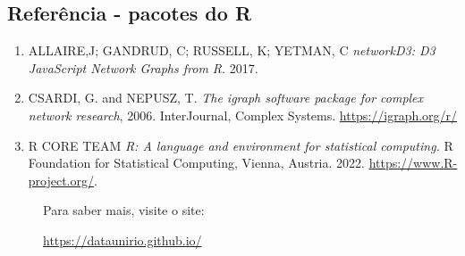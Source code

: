 \documentclass[
]{article}
\def\leftboxbegin{
\begin{figure}
\begin{tcolorbox}[colback=color1,colframe=color1,coltext=white,arc=0mm,boxrule=0pt]
}
\def\leftboxend{
\end{tcolorbox}
\end{figure}
}
\begin{document}
\hypertarget{referuxeancia---pacotes-do-r}{%
\subsection{Referência - pacotes do
R}\label{referuxeancia---pacotes-do-r}}

\begin{enumerate}
\def\labelenumi{\arabic{enumi}.}
\item
  ALLAIRE,J; GANDRUD, C; RUSSELL, K; YETMAN, C \emph{networkD3: D3
  JavaScript Network Graphs from R}. 2017.
\item
  CSARDI, G. and NEPUSZ, T. \emph{The igraph software package for
  complex network research}, 2006. InterJournal, Complex Systems.
  \url{https://igraph.org/r/}
\item
  R CORE TEAM \emph{R: A language and environment for statistical
  computing.} R Foundation for Statistical Computing, Vienna, Austria.
  2022. \url{https://www.R-project.org/}.
\end{enumerate}

\leftboxbegin

Para saber mais, visite o site:

\url{https://dataunirio.github.io/}

\leftboxend
\end{document}
